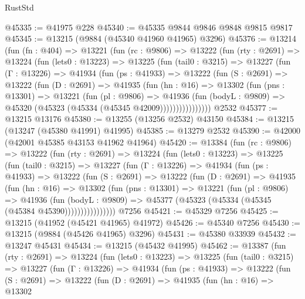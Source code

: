 \begin{lexlean}{RustStd}
\begin{coremodule}
@45335 := @41975 @228
@45340 := @45335 @9844 @9846 @9848 @9815 @9817
@45345 := @13215 (@9884 (@45340 @41960 @41965) @3296)
@45376 := @13214
    (fun (fn : @404) =>
    @13221
      (fun (rc : @9806) =>
      @13222
        (fun (rty : @2691) =>
        @13224
          (fun (lets0 : @13223) =>
          @13225
            (fun (tail0 : @3215) =>
            @13227
              (fun (Γ : @13226) =>
              @41934
                (fun (ps : @41933) =>
                @13222
                  (fun (S : @2691) =>
                  @13222
                    (fun (D : @2691) =>
                    @41935
                      (fun (hn : @16) =>
                      @13302
                        (fun (pns : @13301) =>
                        @13221
                          (fun (pl : @9806) =>
                          @41936
                            (fun (bodyL : @9809) =>
                            @45320 (@45323 (@45334 (@45345 @42009))))))))))))))))
    @2532
@45377 := @13215 @13176
@45380 := @13255 (@13256 @2532) @43150
@45384 := @13215 (@13247 (@45380 @41991) @41995)
@45385 := @13279 @2532
@45390 := @42000 (@42001 @45385 @43153 @41962 @41964)
@45420 := @13384
    (fun (rc : @9806) =>
    @13222
      (fun (rty : @2691) =>
      @13224
        (fun (lets0 : @13223) =>
        @13225
          (fun (tail0 : @3215) =>
          @13227
            (fun (Γ : @13226) =>
            @41934
              (fun (ps : @41933) =>
              @13222
                (fun (S : @2691) =>
                @13222
                  (fun (D : @2691) =>
                  @41935
                    (fun (hn : @16) =>
                    @13302
                      (fun (pns : @13301) =>
                      @13221
                        (fun (pl : @9806) =>
                        @41936
                          (fun (bodyL : @9809) =>
                          @45377 (@45323 (@45334 (@45345 (@45384 @45390))))))))))))))))
    @7256
@45421 := @45329 @7256
@45425 := @13215 (@41952 (@45421 @41965) @41972)
@45426 := @45340 @7256
@45430 := @13215 (@9884 (@45426 @41965) @3296)
@45431 := @45380 @33939
@45432 := @13247 @45431
@45434 := @13215 (@45432 @41995)
@45462 := @13387
    (fun (rty : @2691) =>
    @13224
      (fun (lets0 : @13223) =>
      @13225
        (fun (tail0 : @3215) =>
        @13227
          (fun (Γ : @13226) =>
          @41934
            (fun (ps : @41933) =>
            @13222
              (fun (S : @2691) =>
              @13222
                (fun (D : @2691) =>
                @41935
                  (fun (hn : @16) =>
                  @13302

\end{coremodule}
\end{lexlean}
